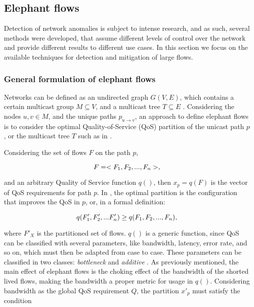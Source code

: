 \subsection {Elephant flows} \label{sec:el_fl}

Detection of network anomalies is subject to intense research, and as such, several methods were developed, that assume different levels of control over the network 
and provide different results to different use cases. In this section we focus on the available techniques for detection and mitigation of large flows.

\subsubsection{General formulation of elephant flows}

Networks can be defined as an undirected graph $G(V, E)$, which contains a certain multicast group $M \subseteq V$, and a multicast tree $T \subseteq E$ 
\cite{lorenz_optimal_2003}. Considering the nodes $u, v \in M$, and the unique paths $p_{u \to v}$, an approach to define elephant flows
is to consider the optimal Quality-of-Service (QoS) partition of the unicast path $p$, or the multicast tree $T$ such as in 
\cite{lorenz_optimal_2003, lorenz_optimal_2002}. 

\par Considering the set of flows $F$ on the path $p$,

\begin{equation*}
    \centering
    F = <F_1, F_2, ..., F_n>,
\end{equation*}

\par and an arbitrary Quality of Service function $q()$, then $x_p = q(F)$ is the vector of QoS requirements 
for path $p$. In \cite{ros-giralt_mathematical_2017}, the optimal partition is the configuration that improves the QoS in $p$, or, in a formal
definition:

\begin{equation*}
    \centering
    q(F'_1, F'_2, ... F'_n) \geq q(F_1, F_2, ..., F_n),
\end{equation*}

\par where $F'_{X}$ is the partitioned set of flows. $q()$ is a generic function, since QoS can be classified with several parameters, like bandwidth, latency,
error rate, and so on, which must then be adapted from case to case. These parameters can be classified in two classes: \textit{bottleneck} and \textit{additive} 
\cite{lorenz_optimal_2003}. As previously mentioned, the main effect of elephant flows is the choking effect of the bandwidth
of the shorted lived flows, making the bandwidth a proper metric for usage in $q()$. Considering bandwidth as the global QoS requirement $Q$, the partition $x'_p$ 
must satisfy the condition

